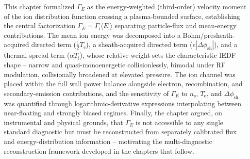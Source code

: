 This chapter formalized $\Gamma_{E}$ as the energy-weighted (third-order) velocity moment of the ion distribution function crossing a plasma-bounded surface, establishing the central factorization $\Gamma_{E} = \Gamma_{\mathrm{i}} \langle E_{\mathrm{i}} \rangle$ separating particle-flux and mean-energy contributions. The mean ion energy was decomposed into a Bohm/presheath-acquired directed term ($\tfrac12 T_{\mathrm{e}}$), a sheath-acquired directed term ($e|\Delta\phi_{\mathrm{sh}}|$), and a thermal spread term ($\alpha T_{\mathrm{i}}$), whose relative weight sets the characteristic IEDF shape -- narrow and quasi-monoenergetic collisionlessly, bimodal under RF modulation, collisionally broadened at elevated pressure. The ion channel was placed within the full wall power balance alongside electron, recombination, and secondary-emission contributions, and the sensitivity of $\Gamma_{E}$ to $n_{\mathrm{s}}$, $T_{\mathrm{e}}$, and $\Delta\phi_{\mathrm{sh}}$ was quantified through logarithmic-derivative expressions interpolating between near-floating and strongly biased regimes. Finally, the chapter argued, on instrumental and physical grounds, that $\Gamma_{E}$ is not accessible to any single standard diagnostic but must be reconstructed from separately calibrated flux and energy-distribution information -- motivating the multi-diagnostic reconstruction framework developed in the chapters that follow.
